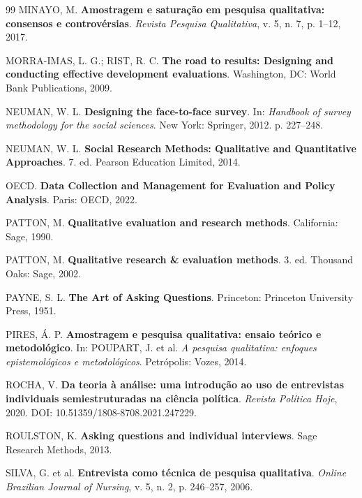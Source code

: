 \documentclass[12pt, a4paper, openany]{book}
\begin{document}
\begin{thebibliography}{99}
MINAYO, M. \textbf{Amostragem e satura\c{c}\~ao em pesquisa qualitativa: consensos e controv\'ersias}. \textit{Revista Pesquisa Qualitativa}, v. 5, n. 7, p. 1--12, 2017.

MORRA-IMAS, L. G.; RIST, R. C. \textbf{The road to results: Designing and conducting effective development evaluations}. Washington, DC: World Bank Publications, 2009.

NEUMAN, W. L. \textbf{Designing the face-to-face survey}. In: \textit{Handbook of survey methodology for the social sciences}. New York: Springer, 2012. p. 227--248.

NEUMAN, W. L. \textbf{Social Research Methods: Qualitative and Quantitative Approaches}. 7. ed. Pearson Education Limited, 2014.

OECD. \textbf{Data Collection and Management for Evaluation and Policy Analysis}. Paris: OECD, 2022.

PATTON, M. \textbf{Qualitative evaluation and research methods}. California: Sage, 1990.

PATTON, M. \textbf{Qualitative research \& evaluation methods}. 3. ed. Thousand Oaks: Sage, 2002.

PAYNE, S. L. \textbf{The Art of Asking Questions}. Princeton: Princeton University Press, 1951.

PIRES, \'A. P. \textbf{Amostragem e pesquisa qualitativa: ensaio te\'orico e metodol\'ogico}. In: POUPART, J. et al. \textit{A pesquisa qualitativa: enfoques epistemol\'ogicos e metodol\'ogicos}. Petr\'opolis: Vozes, 2014.

ROCHA, V. \textbf{Da teoria \`a an\'alise: uma introdu\c{c}\~ao ao uso de entrevistas individuais semiestruturadas na ci\^encia pol\'itica}. \textit{Revista Pol\'itica Hoje}, 2020. DOI: 10.51359/1808-8708.2021.247229.

ROULSTON, K. \textbf{Asking questions and individual interviews}. Sage Research Methods, 2013.

SILVA, G. et al. \textbf{Entrevista como t\'ecnica de pesquisa qualitativa}. \textit{Online Brazilian Journal of Nursing}, v. 5, n. 2, p. 246--257, 2006.


\end{thebibliography}
\end{document}
